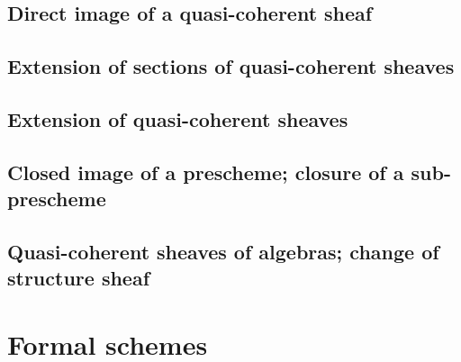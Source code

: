 \documentclass[10pt,oneside]{amsart}
\begin{document}
        \subsection{Direct image of a quasi-coherent sheaf}
        
        
        \subsection{Extension of sections of quasi-coherent sheaves}
        
        
        \subsection{Extension of quasi-coherent sheaves}
        
        
        \subsection{Closed image of a prescheme; closure of a sub-prescheme}
        
        
        \subsection{Quasi-coherent sheaves of algebras; change of structure sheaf}
        
        

    \section{Formal schemes}

\clearpage
\end{document}
